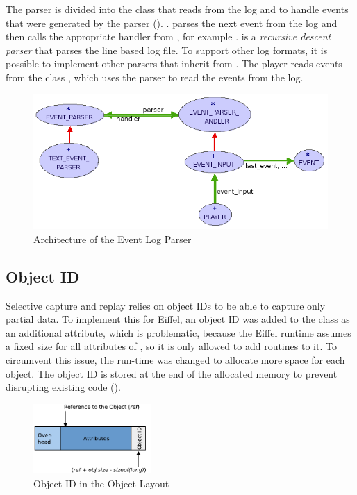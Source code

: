 The parser is divided into the class  that reads from the log and  to handle events that were generated by the parser (). \hspace{0pt}. parses the next event from the log and then calls the appropriate handler from , for example .  
 is a \emph{recursive descent parser} \cite{aho86} that parses the line based log file. To support other log formats, it is possible to implement other parsers that inherit from .
The player reads events from the class , which uses the parser to read the events from the log.

\begin{figure}[ht]
  \centering
  \includegraphics[width=1\textwidth]{illustrations/implementation_parser.png}
  \caption{Architecture of the Event Log Parser}
  \label{fig:implementation_parser}
\end{figure}


\subsection{Object ID}
Selective capture and replay relies on object IDs to be able to capture only partial data. To implement this for Eiffel, an object ID was added to the class  as an additional attribute, which is problematic, because the Eiffel runtime assumes a fixed size for all attributes of , so it is only allowed to add routines to it. To circumvent this issue, the run-time was  changed to allocate more space for each object. The object ID is stored at the end of the allocated memory to prevent disrupting existing code ().
\begin{figure}[ht]
  \centering
  \includegraphics[width=0.4\textwidth]{illustrations/any_object_id}
  \caption{Object ID in the Object Layout}
  \label{fig:any_object_id}
\end{figure}

